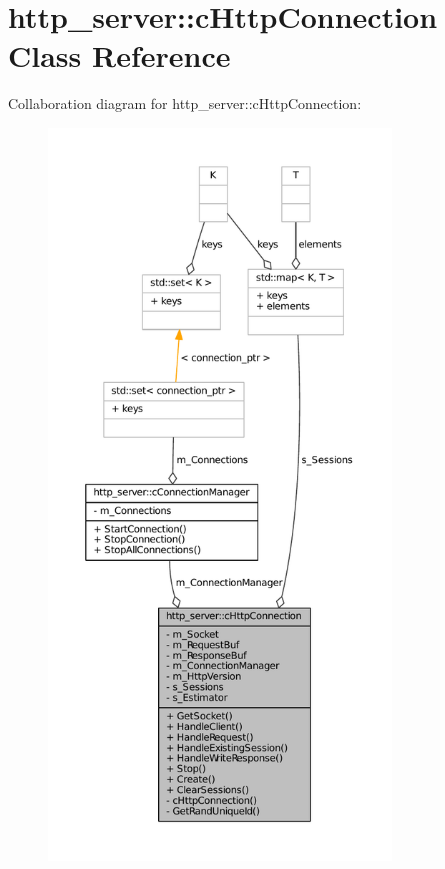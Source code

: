 \hypertarget{classhttp__server_1_1cHttpConnection}{\section{http\-\_\-server\-:\-:c\-Http\-Connection \-Class \-Reference}
\label{classhttp__server_1_1cHttpConnection}
}


\-Collaboration diagram for http\-\_\-server\-:\-:c\-Http\-Connection\-:\nopagebreak
\begin{figure}[H]
\begin{center}
\leavevmode
\includegraphics[height=550pt]{classhttp__server_1_1cHttpConnection__coll__graph}
\end{center}
\end{figure}
